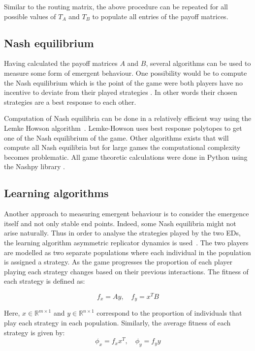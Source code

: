 Similar to the routing matrix, the above procedure can be repeated for all 
possible values of \(T_A\) and \(T_B\) to populate all entries of the payoff 
matrices. 

\subsection{Nash equilibrium}\label{sec:methodology_nash_equilibrium}

Having calculated the payoff matrices \(A\) and \(B\), several algorithms can 
be used to measure some form of emergent behaviour.
One possibility would be to compute the Nash equilibrium
which is the point of the game were both players have no 
incentive to deviate from their played strategies \cite{kreps1989nash}.
In other words their chosen strategies are a best response to each other.

Computation of Nash equilibria can be done in a relatively efficient way using 
the Lemke Howson algorithm~\cite{LemkeHowson}.
Lemke-Howson uses best response polytopes to get one of the Nash equilibrium of
the game. 
Other algorithms exists that will compute all Nash equilibria but 
for large games the computational complexity becomes problematic.
All game theoretic calculations were done in Python using the Nashpy library 
\cite{thenashpyproject}.

\subsection{Learning algorithms}\label{sec:methodology_learning_algorithms}

Another approach to measuring emergent behaviour is to consider 
the emergence itself and not only stable end points. 
Indeed, some Nash equilibria might not arise naturally. 
Thus in order to analyse the strategies played by the two EDs, the learning 
algorithm asymmetric replicator dynamics is 
used~\cite{asymmetricreplicatordynamics}.
The two players are modelled as two separate populations where each 
individual in the population is assigned a strategy.
As the game progresses the proportion of each player playing each strategy 
changes based on their previous interactions.
The fitness of each strategy is defined as:

\begin{equation}\label{eq:asymmetric_fitness}
    f_x = Ay, \quad f_y = x^T B
\end{equation}

Here, \(x \in \mathbb{R}^{m \times 1} \) and
\(y \in \mathbb{R}^{n \times 1}\) correspond to the proportion of individuals 
that play each strategy in each population.
Similarly, the average fitness of each strategy is given by:
\begin{equation}
    \phi_x = f_x x^T, \quad \phi_y = f_y y
\end{equation}

